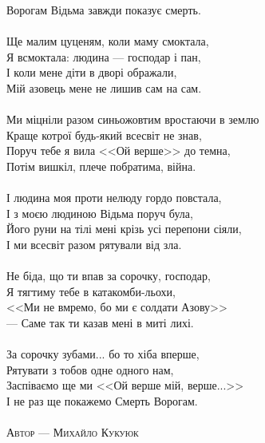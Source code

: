 Ворогам Відьма завжди показує смерть.
\\
\\
Ще малим цуценям, коли маму смоктала,\\
Я всмоктала: людина --- господар і пан,\\
І коли мене діти в дворі ображали,\\
Мій азовець мене не лишив сам на сам.
\\
\\
Ми міцніли разом синьожовтим вростаючи в землю\\
Краще котрої будь-який всесвіт не знав,\\
Поруч тебе я вила <<Ой верше>> до темна,\\
Потім вишкіл, плече побратима, війна.
\\
\\
І людина моя проти нелюду гордо повстала,\\
І з моєю людиною Відьма поруч була,\\
Його руни на тілі мені крізь усі перепони сіяли,\\
І ми всесвіт разом рятували від зла.
\\
\\
Не біда, що ти впав за сорочку, господар,\\
Я тягтиму тебе в катакомби-льохи,\\
<<Ми не вмремо, бо ми є солдати Азову>>\\
--- Саме так ти казав мені в миті лихі.
\\
\\
За сорочку зубами... бо то хіба вперше,\\
Рятувати з тобов одне одного нам,\\
Заспіваємо ще ми <<Ой верше мій, верше...>>\\
І не раз ще покажемо Смерть Ворогам.
\\
\\
\textsc{\footnotesize Автор --- Михайло Кукуюк}

\normalsize
